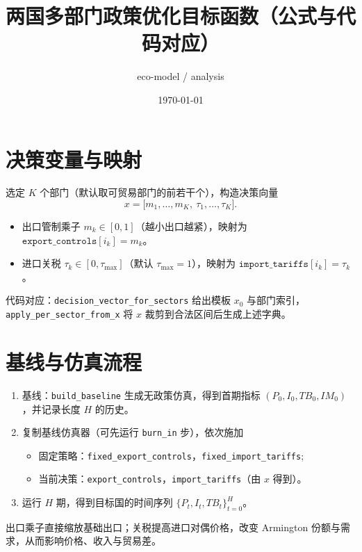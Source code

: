 \documentclass[11pt]{article}
\title{两国多部门政策优化目标函数（公式与代码对应）}
\author{eco-model / analysis}
\date{\today}
\begin{document}
\maketitle

\section{决策变量与映射}
选定 $K$ 个部门（默认取可贸易部门的前若干个），构造决策向量
\[
    x = \big[m_1,\dots,m_K,\ \tau_1,\dots,\tau_K\big].
\]
\begin{itemize}
    \item 出口管制乘子 $m_k \in [0,1]$（越小出口越紧），映射为 $\texttt{export\_controls}[i_k] = m_k$。
    \item 进口关税 $\tau_k \in [0,\tau_{\max}]$（默认 $\tau_{\max}=1$），映射为 $\texttt{import\_tariffs}[i_k] = \tau_k$。
\end{itemize}
代码对应：\verb|decision_vector_for_sectors| 给出模板 $x_0$ 与部门索引，\verb|apply_per_sector_from_x| 将 $x$ 裁剪到合法区间后生成上述字典。

\section{基线与仿真流程}
\begin{enumerate}
    \item 基线：\verb|build_baseline| 生成无政策仿真，得到首期指标 $(P_0, I_0, TB_0, IM_0)$，并记录长度 $H$ 的历史。
    \item 复制基线仿真器（可先运行 \texttt{burn\_in} 步），依次施加
    \begin{itemize}
        \item 固定策略：\verb|fixed_export_controls|，\verb|fixed_import_tariffs|;
        \item 当前决策：\verb|export_controls|，\verb|import_tariffs|（由 $x$ 得到）。
    \end{itemize}
    \item 运行 $H$ 期，得到目标国的时间序列 $\{P_t, I_t, TB_t\}_{t=0}^H$。
\end{enumerate}
出口乘子直接缩放基础出口；关税提高进口对偶价格，改变 Armington 份额与需求，从而影响价格、收入与贸易差。
\end{document}
